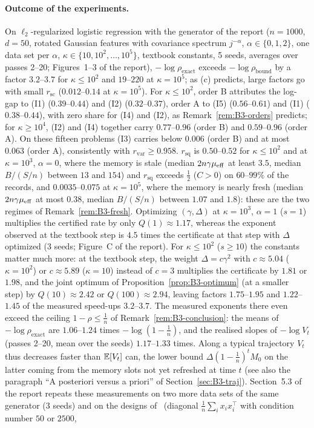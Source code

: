 \paragraph{Outcome of the experiments.}
On $\ell_2$-regularized logistic regression with the generator of the report ($n=1000$, $d=50$, rotated Gaussian features with covariance spectrum $j^{-\alpha}$, $\alpha\in\{0,1,2\}$, one data set per $\alpha$, $\kappa\in\{10,10^2,\dots,10^5\}$, textbook constants, 5 seeds, averages over passes 2--20; Figures~1--3 of the report), $-\log\rho_{\mathrm{exact}}$ exceeds $-\log\rho_{\mathrm{bound}}$ by a factor $3.2$--$3.7$ for $\kappa\le10^2$ and $19$--$220$ at $\kappa=10^5$; as (c) predicts, large factors go with small $r_{\mathrm{sc}}$ ($0.012$--$0.14$ at $\kappa=10^5$). For $\kappa\le10^2$, order B attributes the log-gap to (I1) ($0.39$--$0.44$) and (I2) ($0.32$--$0.37$), order A to (I5) ($0.56$--$0.61$) and (I1) ($0.38$--$0.44$), with zero share for (I4) and (I2), as Remark~\ref{rem:B3-orders} predicts; for $\kappa\ge10^4$, (I2) and (I4) together carry $0.77$--$0.96$ (order B) and $0.59$--$0.96$ (order A). On these fifteen problems (I3) carries below $0.006$ (order B) and at most $0.063$ (order A), consistently with $r_{\mathrm{var}}\ge0.958$. $r_{\mathrm{sq}}$ is $0.50$--$0.52$ for $\kappa\le10^2$ and at $\kappa=10^3$, $\alpha=0$, where the memory is stale (median $2n\gamma\mu_{\mathrm{eff}}$ at least $3.5$, median $B/(S/n)$ between $13$ and $154$) and $r_{\mathrm{sq}}$ exceeds $\frac12$ ($C>0$) on $60$--$99\%$ of the records, and $0.0035$--$0.075$ at $\kappa=10^5$, where the memory is nearly fresh (median $2n\gamma\mu_{\mathrm{eff}}$ at most $0.38$, median $B/(S/n)$ between $1.07$ and $1.8$): these are the two regimes of Remark~\ref{rem:B3-fresh}. Optimizing $(\gamma,\Delta)$ at $\kappa=10^3$, $\alpha=1$ ($s=1$) multiplies the certified rate by only $Q(1)\approx1.17$, whereas the exponent observed at the textbook step is $4.5$ times the certificate at that step with $\Delta$ optimized (3 seeds; Figure~C of the report). For $\kappa\le10^2$ ($s\ge10$) the constants matter much more: at the textbook step, the weight $\Delta=c\gamma^2$ with $c\approx5.04$ ($\kappa=10^2$) or $c\approx5.89$ ($\kappa=10$) instead of $c=3$ multiplies the certificate by $1.81$ or $1.98$, and the joint optimum of Proposition~\ref{prop:B3-optimum} (at a smaller step) by $Q(10)\approx2.42$ or $Q(100)\approx2.94$, leaving factors $1.75$--$1.95$ and $1.22$--$1.45$ of the measured speed-ups $3.2$--$3.7$. The measured exponents there even exceed the ceiling $1-\rho\le\frac1n$ of Remark~\ref{rem:B3-conclusion}: the means of $-\log\rho_{\mathrm{exact}}$ are $1.06$--$1.24$ times $-\log(1-\frac1n)$, and the realised slopes of $-\log V_t$ (passes 2--20, mean over the seeds) $1.17$--$1.33$ times. Along a typical trajectory $V_t$ thus decreases faster than $\mathbb{E}[V_t]$ can, the lower bound $\Delta(1-\frac1n)^tM_0$ on the latter coming from the memory slots not yet refreshed at time $t$ (see also the paragraph ``A posteriori versus a priori'' of Section~\ref{sec:B3-traj}). Section~5.3 of the report repeats these measurements on two more data sets of the same generator (3 seeds) and on the designs of~\cite{na2023hessian} (diagonal $\frac1n\sum_ix_ix_i^\top$ with condition number $50$ or $2500$, 